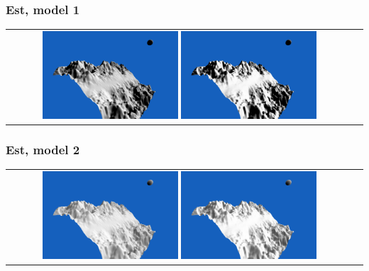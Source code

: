 \documentclass[a4paper]{article}
\begin{document}
\subsubsection{Est, model 1}
\begin{tabular}{cc}
\includegraphics[width=0.4\textwidth]{Images/Essais/Essai_10_phong_East_0.png}
\includegraphics[width=0.4\textwidth]{Images/Essais/Essai_10_slint_East_0.png}
\end{tabular}
\subsubsection{Est, model 2}
\begin{tabular}{cc}
\includegraphics[width=0.4\textwidth]{Images/Essais/Essai_10_phong_East_1.png}
\includegraphics[width=0.4\textwidth]{Images/Essais/Essai_10_slint_East_1.png}
\end{tabular}
\end{document}
